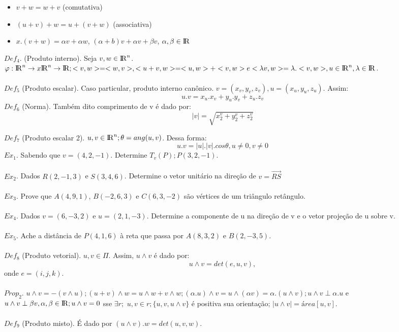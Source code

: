 \documentclass{article}
\begin{document}
\begin{enumerate}
\begin{itemize}
            \item $v + w = w + v$ (comutativa)
            \item $(u + v) + w = u + (v + w)$ (associativa)
            \item $x . (v + w) = \alpha v + \alpha w$, $(\alpha + b)v + \alpha v + \beta v$, $\alpha, \beta \in {\rm I\!R}$
        \end{itemize}
        $Def_4$. (Produto interno). Seja $v, w \in {\rm I\!R}^n$. $\varphi : {\rm I\!R}^n \rightarrow{} x {\rm I\!R}^n \rightarrow{} {\rm I\!R}; <v,w> = <w,v>, <u + v, w> = <u,w> + <v,w> e <\lambda v,w> = \lambda . <v,w>, u \in {\rm I\!R}^n, \lambda \in {\rm I\!R}$.\\
        \\
        $Def_5$ (Produto escalar). Caso particular, produto interno canônico. $v = (x_v, y_v, z_v), u = (x_u, y_u, z_u).$ Assim:
        $$ u.v = x_u . x_v + y_u . y_v + z_u . z_v$$
        $Def_6$ (Norma). Também dito comprimento de v é dado por:
        $$ |v| = \sqrt{x_2^v + y_2^v + z_2^v} $$
        
        $Def_7$ (Produto escalar 2). $u,v \in {\rm I\!R}^n; \theta = ang(u,v)$. Dessa forma:
        $$ u.v = |u|.|v|.cos\theta, u \neq 0, v \neq 0 $$
        $Ex_1$. Sabendo que $v = (4,2,-1)$. Determine $T_v(P); P(3,2,-1)$.\\
        \\
        $Ex_2$. Dados $R(2,-1,3)$ e $S(3,4,6)$. Determine o vetor unitário na direção de $v = \overrightarrow{RS}$\\
        \\
        $Ex_3$. Prove que $A(4,9,1)$, $B(-2,6,3)$ e $C(6,3,-2)$ são vértices  de um triângulo retângulo.\\
        \\
        $Ex_4$. Dados $v = (6,-3,2)$ e $u = (2,1,-3)$. Determine a componente de u na direção de v e o vetor projeção de u sobre v.\\
        \\
        $Ex_5$. Ache a distância de $P(4,1,6)$ à reta que passa por $A(8,3,2)$ e $B(2,-3,5)$.\\
        \\
        $Def_8$ (Produto vetorial). $u, v \in \Pi$. Assim, $ u \wedge v$ é dado por: $$ u \wedge v = det(e, u, v), $$
        onde $e = (i,j,k)$.\\
        \\
        $Prop_2$. $u \wedge v = -(v \wedge u); (u + v) \wedge w = u \wedge w + v \wedge w; (\alpha . u) \wedge v = u \wedge (\alpha v) = \alpha . (u \wedge v); u \wedge v \perp \alpha . u$ e $ u \wedge v \perp \beta v, \alpha, \beta \in  {\rm I\!R}; u \wedge v = 0$ sse $\exists r;$ $u,v \in r; \{ u,v, u \wedge v \}$ é positiva sua orientação; $|u \wedge v| = área[u,v]$. \\
        \\
        $Def_9$ (Produto misto). É dado por $(u \wedge v).w = det(u, v, w)$.\\
    

\end{enumerate}
\end{document}
